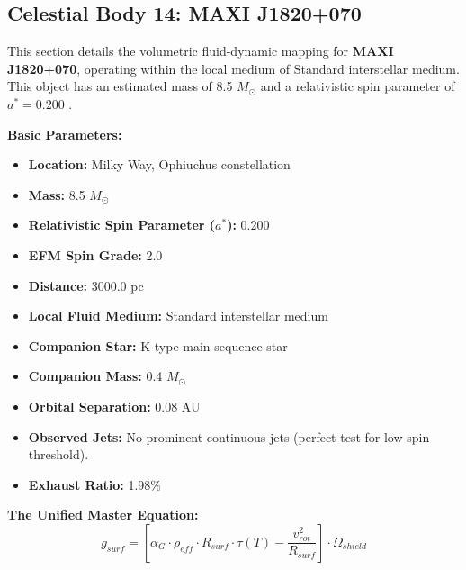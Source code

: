 \documentclass[11pt, a4paper]{article}
\begin{document}
\clearpage
\subsection{Celestial Body 14: MAXI J1820+070}
This section details the volumetric fluid-dynamic mapping for \textbf{MAXI J1820+070}, operating within the local medium of Standard interstellar medium. This object has an estimated mass of 8.5 $M_{\odot}$ and a relativistic spin parameter of $a^* = 0.200$ \cite{torres2020, simbad}.

\vspace{0.5em}
\noindent \textbf{Basic Parameters:}
\begin{itemize}
  \item \textbf{Location:} Milky Way, Ophiuchus constellation
  \item \textbf{Mass:} 8.5 $M_{\odot}$
  \item \textbf{Relativistic Spin Parameter ($a^*$):} 0.200
  \item \textbf{EFM Spin Grade:} 2.0
  \item \textbf{Distance:} 3000.0 pc
  \item \textbf{Local Fluid Medium:} Standard interstellar medium
  \item \textbf{Companion Star:} K-type main-sequence star
  \item \textbf{Companion Mass:} 0.4 $M_{\odot}$
  \item \textbf{Orbital Separation:} 0.08 AU
  \item \textbf{Observed Jets:} No prominent continuous jets (perfect test for low spin threshold).
  \item \textbf{Exhaust Ratio:} 1.98\%
\end{itemize}

\vspace{0.5em}
\noindent \textbf{The Unified Master Equation:}
$$ g_{surf} = \left[ \alpha_G \cdot \rho_{eff} \cdot R_{surf} \cdot \tau(T) - \frac{v_{rot}^2}{R_{surf}} \right] \cdot \Omega_{shield} $$
\end{document}
